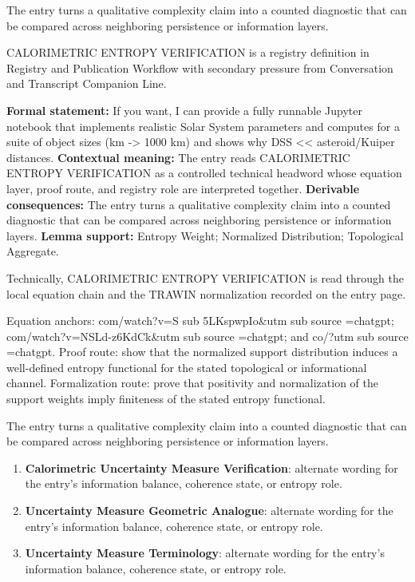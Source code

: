 The entry turns a qualitative complexity claim into a counted diagnostic that can be compared across neighboring persistence or information layers.
\clearpage


\begingroup\small
{}
CALORIMETRIC ENTROPY VERIFICATION is a registry definition in Registry and Publication Workflow with secondary pressure from Conversation and Transcript Companion Line.

\begingroup\footnotesize\setlength{\emergencystretch}{3em}\sloppy
\textbf{Formal statement:} If you want, I can provide a fully runnable Jupyter notebook that implements realistic Solar System parameters and computes for a suite of object sizes (km -> 1000 km) and shows why DSS << asteroid/Kuiper distances. \textbf{Contextual meaning:} The entry reads CALORIMETRIC ENTROPY VERIFICATION as a controlled technical headword whose equation layer, proof route, and registry role are interpreted together. \textbf{Derivable consequences:} The entry turns a qualitative complexity claim into a counted diagnostic that can be compared across neighboring persistence or information layers. \textbf{Lemma support:} Entropy Weight; Normalized Distribution; Topological Aggregate.\par
\endgroup

Technically, CALORIMETRIC ENTROPY VERIFICATION is read through the local equation chain and the TRAWIN normalization recorded on the entry page.

Equation anchors: com/watch?v=S sub 5LKspwpIo\&utm sub source =chatgpt; com/watch?v=NSLd-z6KdCk\&utm sub source =chatgpt; and co/?utm sub source =chatgpt. Proof route: show that the normalized support distribution induces a well-defined entropy functional for the stated topological or informational channel. Formalization route: prove that positivity and normalization of the support weights imply finiteness of the stated entropy functional.

The entry turns a qualitative complexity claim into a counted diagnostic that can be compared across neighboring persistence or information layers.
\endgroup

\begin{enumerate}[leftmargin=1.6em,itemsep=6pt,topsep=4pt]
\item \textbf{Calorimetric Uncertainty Measure Verification}: alternate wording for the entry's information balance, coherence state, or entropy role.
\item \textbf{Uncertainty Measure Geometric Analogue}: alternate wording for the entry's information balance, coherence state, or entropy role.
\item \textbf{Uncertainty Measure Terminology}: alternate wording for the entry's information balance, coherence state, or entropy role.
\end{enumerate}

